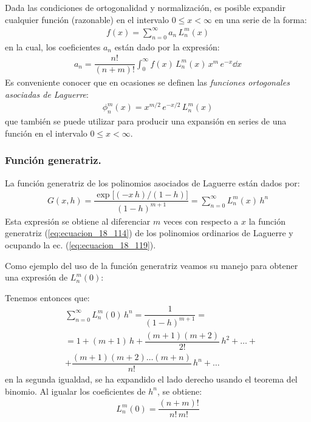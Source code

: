 Dada las condiciones de ortogonalidad y normalización, es posible expandir cualquier función (razonable) en el intervalo $0 \leq x < \infty$ en una serie de la forma:
\begin{align*}
f(x) = \sum_{n=0}^{\infty} a_{n} \, L_{n}^{m} (x)
\end{align*}
en la cual, los coeficientes $a_{n}$ están dado por la expresión:
\begin{align*}
a_{n} = \dfrac{n!}{(n + m)!} \int_{0}^{\infty} f(x) \, L_{n}^{m}(x) \, x^{m} \, e^{-x} \dd{x}
\end{align*}
Es conveniente conocer que en ocasiones se definen las \emph{funciones ortogonales asociadas de Laguerre}:
\begin{align*}
\phi_{n}^{m} (x) = x^{m/2} \, e^{-x/2} \, L_{n}^{m} (x)
\end{align*}
que también se puede utilizar para producir una expansión en series de una función en el intervalo $0 \leq x < \infty$.

\subsubsection{Función generatriz.}

La función generatriz de los polinomios asociados de Laguerre están dados por:
\begin{align}
G(x, h) = \dfrac{\exp\big[(-x \, h)/(1 - h)\big]}{(1 - h)^{m+1}} = \sum_{n=0}^{\infty} L_{n}^{m} (x) \, h^{n}
\label{eq:ecuacion_18_123}
\end{align}
Esta expresión se obtiene al diferenciar $m$ veces con respecto a $x$ la función generatriz (\ref{eq:ecuacion_18_114}) de los polinomios ordinarios de Laguerre y ocupando la ec. (\ref{eq:ecuacion_18_119}).
\par
Como ejemplo del uso de la función generatriz veamos su manejo para obtener una expresión de $L_{n}^{m}(0)$:
\par
Tenemos entonces que:
\begin{align*}
&\sum_{n=0}^{\infty} L_{n}^{m} (0) \, h^{n} = \dfrac{1}{(1 - h)^{m+1}} = \\[0.5em]
&= 1 + (m + 1) \, h + \dfrac{(m + 1)(m + 2)}{2!} \, h^{2} + \ldots + \\[0.5em]
&+ \dfrac{(m + 1)(m + 2) \ldots (m + n)}{n!} \, h^{n} + \ldots  
\end{align*}
en la segunda igualdad, se ha expandido el lado derecho usando el teorema del binomio. Al igualar los coeficientes de $h^{n}$, se obtiene:
\begin{align*}
L_{n}^{m} (0) = \dfrac{(n + m)!}{n! \, m!}
\end{align*}

